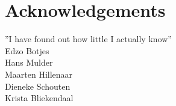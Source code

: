 {}
\chapter*{Acknowledgements}
\bigskip

''I have found out how little I actually know''\\

\noindent Edzo Botjes\\
Hans Mulder\\
Maarten Hillenaar\\
Dieneke Schouten\\
Krista Bliekendaal\\
